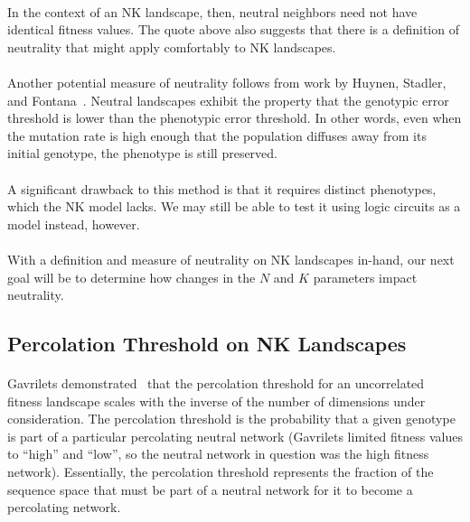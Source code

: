 \documentclass[12pt,letterpaper,titlepage]{article}
\begin{document}
\paragraph{}
In the context of an NK landscape, then, neutral neighbors need not have
identical fitness values. The quote above also suggests that there is a
definition of neutrality that might apply comfortably to NK landscapes.

\paragraph{}
Another potential measure of neutrality follows from work by Huynen, Stadler,
and Fontana~\cite{Huynen1996a}. Neutral landscapes exhibit the property that
the genotypic error threshold is lower than the phenotypic error threshold. In
other words, even when the mutation rate is high enough that the population
diffuses away from its initial genotype, the phenotype is still preserved.

\paragraph{}
A significant drawback to this method is that it requires distinct phenotypes,
which the NK model lacks. We may still be able to test it using logic circuits
as a model instead, however.

\paragraph{}
With a definition and measure of neutrality on NK landscapes in-hand, our next
goal will be to determine how changes in the $N$ and $K$ parameters impact
neutrality.

\subsection{Percolation Threshold on NK Landscapes}

\paragraph{}
Gavrilets demonstrated~\cite{Gavrilets1997} that the percolation threshold for
an uncorrelated fitness landscape scales with the inverse of the number of
dimensions under consideration. The percolation threshold is the probability
that a given genotype is part of a particular percolating neutral network
(Gavrilets limited fitness values to ``high'' and ``low'', so the neutral
network in question was the high fitness network). Essentially, the percolation
threshold represents the fraction of the sequence space that must be part of a
neutral network for it to become a percolating network.
\end{document}
